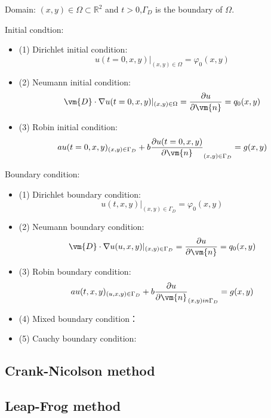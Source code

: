 Domain: $(x,y) \in \Omega \subset \mathbb {R}^2 $ and $t>0$,$\Gamma_D$ is the boundary of $\Omega$.

Initial condtion:
\begin{itemize}
	\itemsep=4pt
	\parskip=2pt
	\item (1) Dirichlet initial condition: 
	$$u(t=0,x,y)|_{(x,y) \in \Omega}=\varphi_0(x,y)$$
	\item (2) Neumann initial condition:
	 $$ \vm{D} \cdot \nabla u(t=0,x,y)|_{(x,y) \in \Omega} = \frac{\partial u}{\partial \vm{n}} = q_0(x,y)$$
	\item (3) Robin initial condition:
	$$ a u(t=0,x,y)_{(x,y) \in \Gamma_D} +b \frac{\partial u(t=0,x,y)}{\partial \vm{n}}_{(x,y) \in \Gamma_D} = g(x,y)$$
\end{itemize}
	
Boundary condition:
\begin{itemize}
	\itemsep=4pt
	\parskip=2pt
	\item (1) Dirichlet boundary condition: 
	$$u(t,x,y)|_{(x,y) \in \Gamma_D}=\varphi_0(x,y)$$
	\item (2) Neumann boundary condition:
	$$ \vm{D} \cdot \nabla u(u,x,y)|_{(x,y) \in \Gamma_D} = \frac{\partial u}{\partial \vm{n}} = q_0(x,y)$$
	\item (3) Robin boundary condition:
	$$ a u(t,x,y)_{(u,x,y) \in \Gamma_D} +b \frac{\partial u}{\partial \vm{n}}_{(x,y) in \Gamma_D} = g(x,y)$$
	\item (4) Mixed boundary condition：

	\item (5) Cauchy boundary condition:
	
\end{itemize}	
	
	
	
	
	
	 
\subsection{Crank-Nicolson method}



\subsection{Leap-Frog method}


